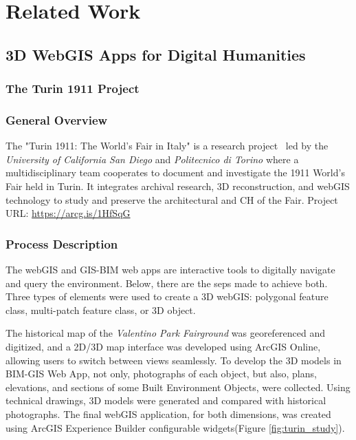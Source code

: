 
%


\chapter{Related Work}
\label{cha:related_work}


\section{3D WebGIS Apps for Digital Humanities}
\label{sec:webgis}

\subsection{The Turin 1911 Project}
\label{sec:turin_project} 


\subsection*{General Overview}

The "Turin 1911: The World's Fair in Italy" is a research project~\cite{spreafico20233d} led by the \textit{University of California San Diego} and  \textit{Politecnico di Torino} where a multidisciplinary team cooperates to document and investigate the 1911 World’s Fair held in Turin.
It integrates archival research, \gls{3D} reconstruction, and web\gls{GIS} technology to study and preserve the architectural and \gls{CH} of the Fair. Project URL: \url{https://arcg.is/1HfSqG} 

\subsection*{Process Description}

The web\gls{GIS} and \gls{GIS}-\gls{BIM} web apps are interactive tools to digitally navigate and query the environment. Below, there are the seps made to achieve both.
Three types of elements were used to create a \gls{3D} web\gls{GIS}: polygonal feature class, multi-patch feature class, or \gls{3D} object.

The historical map of the \textit{Valentino Park Fairground} was georeferenced and digitized, and a \gls{2D}/\gls{3D} map interface was developed using ArcGIS Online, allowing users to switch between views seamlessly. 
To develop the \gls{3D} models in \gls{BIM}-\gls{GIS} Web App, not only, photographs of each object, but also, plans, elevations, and sections of some Built Environment Objects, were collected. Using technical drawings, \gls{3D} models were generated and compared with historical photographs.
The final web\gls{GIS} application, for both dimensions, was created using ArcGIS Experience Builder configurable widgets(Figure \ref{fig:turin_study}).


